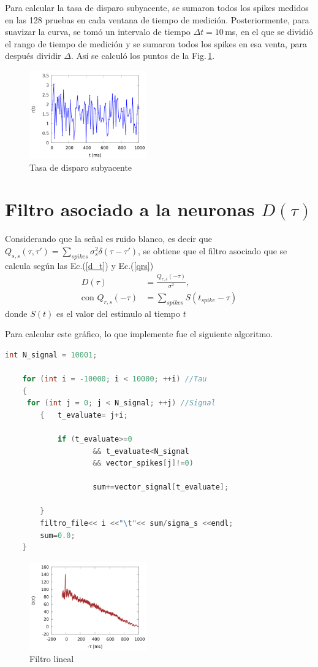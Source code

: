Para calcular la tasa de disparo subyacente,  se sumaron todos los spikes medidos en las 128 pruebas en cada ventana de tiempo de medición. Posteriormente, para suavizar la curva, se tomó un intervalo de tiempo $\Delta t = 10\,$ms, en el que se dividió el rango de tiempo de medición y se sumaron todos los spikes en esa venta, para después dividir $\Delta$. Así se calculó los puntos de la Fig.\,\ref{r_t}.


\begin{figure}[H]
	\centering
	\includegraphics[width=0.45\textwidth]{../Graficos/r_t.png}
	\caption{Tasa de disparo subyacente}
	\label{r_t}
\end{figure}

\section*{Filtro asociado a la neuronas \texorpdfstring{$D(\tau)$}{}}


Considerando que la señal es ruido blanco, es decir que $Q_{s,s}(\tau, \tau')= \sum_{spikes} \sigma^2_s \delta(\tau-\tau')$, se obtiene que el filtro asociado que se  calcula  según las Ec.(\ref{d_t}) y Ec.(\ref{qrs}) 
\begin{align}
    D(\tau) &= \frac{Q_{r,s}(-\tau)}{\sigma^2}, \label{d_t}\\
    \text{con } Q_{r,s}(-\tau) &= \sum_{spikes} S(t_{spike} - \tau) \label{qrs}
\end{align}
donde $S(t)$ es el valor del estimulo al tiempo $t$

Para calcular este gráfico, lo que implemente fue el siguiente algoritmo.

\begin{lstlisting}[language=C++]
	int N_signal = 10001;

	for (int i = -10000; i < 10000; ++i) //Tau
	{
	 for (int j = 0; j < N_signal; ++j) //Signal
		{	t_evaluate= j+i;
			
			if (t_evaluate>=0 
					&& t_evaluate<N_signal 
					&& vector_spikes[j]!=0) 

					sum+=vector_signal[t_evaluate];
				
		}
		filtro_file<< i <<"\t"<< sum/sigma_s <<endl;
		sum=0.0;
	}
\end{lstlisting}


\begin{figure}[H]
	\centering
	\includegraphics[width=0.45\textwidth]{../Graficos/D_tau.png}
	\caption{Filtro lineal}
\end{figure}




